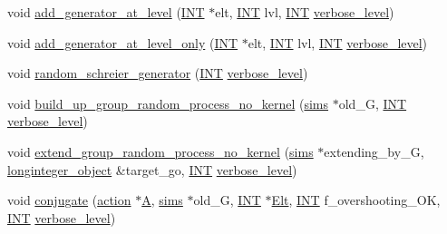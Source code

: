 \begin{DoxyCompactItemize}
\item 
void \mbox{\hyperlink{classsims_ac9f0f17058381524d70645e9d6893e4d}{add\+\_\+generator\+\_\+at\+\_\+level}} (\mbox{\hyperlink{galois_8h_a09fddde158a3a20bd2dcadb609de11dc}{I\+NT}} $\ast$elt, \mbox{\hyperlink{galois_8h_a09fddde158a3a20bd2dcadb609de11dc}{I\+NT}} lvl, \mbox{\hyperlink{galois_8h_a09fddde158a3a20bd2dcadb609de11dc}{I\+NT}} \mbox{\hyperlink{simeon_8_c_a818073fbcc2f439e7c56952f67386122}{verbose\+\_\+level}})
\item 
void \mbox{\hyperlink{classsims_aed07e3f4041b31d62479ed90c4cc88c8}{add\+\_\+generator\+\_\+at\+\_\+level\+\_\+only}} (\mbox{\hyperlink{galois_8h_a09fddde158a3a20bd2dcadb609de11dc}{I\+NT}} $\ast$elt, \mbox{\hyperlink{galois_8h_a09fddde158a3a20bd2dcadb609de11dc}{I\+NT}} lvl, \mbox{\hyperlink{galois_8h_a09fddde158a3a20bd2dcadb609de11dc}{I\+NT}} \mbox{\hyperlink{simeon_8_c_a818073fbcc2f439e7c56952f67386122}{verbose\+\_\+level}})
\item 
void \mbox{\hyperlink{classsims_aaa77048e586c36a7639fa61ff66e0a23}{random\+\_\+schreier\+\_\+generator}} (\mbox{\hyperlink{galois_8h_a09fddde158a3a20bd2dcadb609de11dc}{I\+NT}} \mbox{\hyperlink{simeon_8_c_a818073fbcc2f439e7c56952f67386122}{verbose\+\_\+level}})
\item 
void \mbox{\hyperlink{classsims_a33747471a3e1ebdee59aff4edde62669}{build\+\_\+up\+\_\+group\+\_\+random\+\_\+process\+\_\+no\+\_\+kernel}} (\mbox{\hyperlink{classsims}{sims}} $\ast$old\+\_\+G, \mbox{\hyperlink{galois_8h_a09fddde158a3a20bd2dcadb609de11dc}{I\+NT}} \mbox{\hyperlink{simeon_8_c_a818073fbcc2f439e7c56952f67386122}{verbose\+\_\+level}})
\item 
void \mbox{\hyperlink{classsims_a20958fd83e43b33c009e873b9df2fa11}{extend\+\_\+group\+\_\+random\+\_\+process\+\_\+no\+\_\+kernel}} (\mbox{\hyperlink{classsims}{sims}} $\ast$extending\+\_\+by\+\_\+G, \mbox{\hyperlink{classlonginteger__object}{longinteger\+\_\+object}} \&target\+\_\+go, \mbox{\hyperlink{galois_8h_a09fddde158a3a20bd2dcadb609de11dc}{I\+NT}} \mbox{\hyperlink{simeon_8_c_a818073fbcc2f439e7c56952f67386122}{verbose\+\_\+level}})
\item 
void \mbox{\hyperlink{classsims_ae5fdcadcb51929b4f5c02347384d8b8d}{conjugate}} (\mbox{\hyperlink{classaction}{action}} $\ast$\mbox{\hyperlink{classsims_a3311c97dc08837220191985b1c7ee73f}{A}}, \mbox{\hyperlink{classsims}{sims}} $\ast$old\+\_\+G, \mbox{\hyperlink{galois_8h_a09fddde158a3a20bd2dcadb609de11dc}{I\+NT}} $\ast$\mbox{\hyperlink{simeon_8_c_aec1406935bdb1fee3561fcb840964100}{Elt}}, \mbox{\hyperlink{galois_8h_a09fddde158a3a20bd2dcadb609de11dc}{I\+NT}} f\+\_\+overshooting\+\_\+\+OK, \mbox{\hyperlink{galois_8h_a09fddde158a3a20bd2dcadb609de11dc}{I\+NT}} \mbox{\hyperlink{simeon_8_c_a818073fbcc2f439e7c56952f67386122}{verbose\+\_\+level}})

\end{DoxyCompactItemize}
